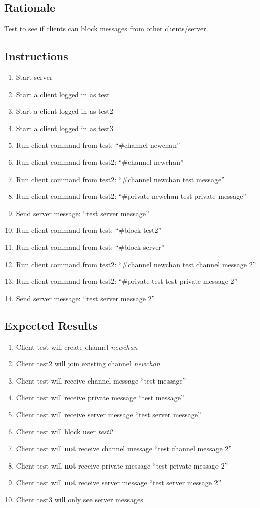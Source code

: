 \documentclass[12pt]{article}
\begin{document}
\subsection*{Rationale}
Test to see if clients can block messages from other clients/server.

\subsection*{Instructions}
\begin{enumerate}
\item Start server
\item Start a client logged in as test
\item Start a client logged in as test2
\item Start a client logged in as test3
\item Run client command from test: ``\#channel newchan''
\item Run client command from test2: ``\#channel newchan''
\item Run client command from test2: ``\#channel newchan test message''
\item Run client command from test2: ``\#private newchan test private message''
\item Send server message: ``test server message''
\item Run client command from test: ``\#block test2''
\item Run client command from test: ``\#block server''
\item Run client command from test2: ``\#channel newchan test channel message 2''
\item Run client command from test2: ``\#private test test private message 2''
\item Send server message: ``test server message 2''
\end{enumerate}

\subsection*{Expected Results}
\begin{enumerate}
\item Client test will create channel \emph{newchan}
\item Client test2 will join existing channel \emph{newchan}
\item Client test will receive channel message ``test message''
\item Client test will receive private message ``test message''
\item Client test will receive server message ``test server message''
\item Client test will block user \emph{test2}
\item Client test will \textbf{not} receive channel message ``test channel message 2''
\item Client test will \textbf{not} receive private message ``test private message 2''
\item Client test will \textbf{not} receive server message ``test server message 2''
\item Client test3 will only see server messages
\end{enumerate}
\end{document}
